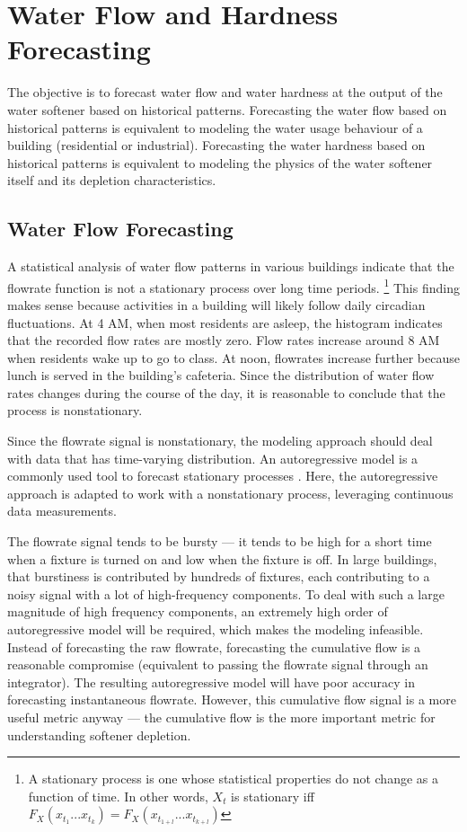 \section{Water Flow and Hardness Forecasting}

The objective is to forecast water flow and water hardness at the output of the water softener based on historical patterns.
 Forecasting the water flow based on historical patterns is equivalent to modeling the water usage behaviour of a building (residential or industrial).
 Forecasting the water hardness based on historical patterns is equivalent to modeling the physics of the water softener itself and its depletion characteristics.

\subsection{Water Flow Forecasting}

A statistical analysis of water flow patterns in various buildings indicate that the flowrate function is not a stationary process over long time periods.
 \footnote{A stationary process is one whose statistical properties do not change as a function of time. In other words, $X_t$ is stationary iff $F_X (x_{t_1} ... x_{t_k}) = F_X (x_{t_{1+l}} ... x_{t_{k+l}})$}
 This finding makes sense because activities in a building will likely follow daily circadian fluctuations.
 At 4 AM, when most residents are asleep, the histogram indicates that the recorded flow rates are mostly zero.
 Flow rates increase around 8 AM when residents wake up to go to class.
 At noon, flowrates increase further because lunch is served in the building's cafeteria.
 Since the distribution of water flow rates changes during the course of the day, it is reasonable to conclude that the process is nonstationary.

Since the flowrate signal is nonstationary, the modeling approach should deal with data that has time-varying distribution.
 An autoregressive model is a commonly used tool to forecast stationary processes \cite{oppenheim2010discrete}.
 Here, the autoregressive approach is adapted to work with a nonstationary process, leveraging continuous data measurements.

The flowrate signal tends to be bursty --- it tends to be high for a short time when a fixture is turned on and low when the fixture is off.
 In large buildings, that burstiness is contributed by hundreds of fixtures, each contributing to a noisy signal with a lot of high-frequency components.
 To deal with such a large magnitude of high frequency components, an extremely high order of autoregressive model will be required, which makes the modeling infeasible.
 Instead of forecasting the raw flowrate, forecasting the cumulative flow is a reasonable compromise (equivalent to passing the flowrate signal through an integrator).
 The resulting autoregressive model will have poor accuracy in forecasting instantaneous flowrate.
 However, this cumulative flow signal is a more useful metric anyway --- the cumulative flow is the more important metric for understanding softener depletion.

